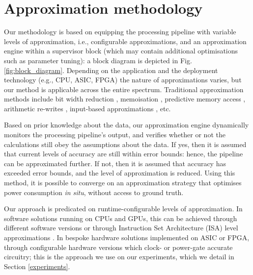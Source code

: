 \section{Approximation methodology}\label{learning}

Our methodology is based on equipping the processing pipeline with variable levels of approximation, i.e., configurable approximations, and an approximation engine within a supervisor block (which may contain additional optimisations such as parameter tuning): a block diagram is depicted in Fig. \ref{fig:block_diagram}. Depending on the application and the deployment technology (e.g., CPU, ASIC, FPGA) the nature of approximations varies, but our method is applicable across the entire spectrum. Traditional approximation methods include bit width reduction \cite{mittal2016survey}, memoisation \cite{sinha2016low}, predictive memory access \cite{yazdanbakhsh2016mitigating}, arithmetic re-writes \cite{nepal2016automated}, input-based approximations \cite{raha2016input}, etc.
\par Based on prior knowledge about the data, our approximation engine dynamically monitors the processing pipeline's output, and verifies whether or not the calculations still obey the assumptions about the data. If yes, then it is assumed that current levels of accuracy are still within error bounds: hence, the pipeline can be approximated further. If not, then it is assumed that accuracy has exceeded error bounds, and the level of approximation is reduced. Using this method, it is possible to converge on an approximation strategy that optimises power consumption \textit{in situ}, without access to ground truth. 

\par Our approach is predicated on runtime-configurable levels of approximation. In software solutions running on CPUs and GPUs, this can be achieved through different software versions \cite{vassiliadis2015programming} or through Instruction Set Architecture (ISA) level approximations \cite{Vassiliadis:2015:PMR:2858788.2688546}. In bespoke hardware solutions implemented on ASIC or FPGA, through configurable hardware versions which clock- or power-gate accurate circuitry; this is the approach we use on our experiments, which we detail in Section \ref{experiments}.

